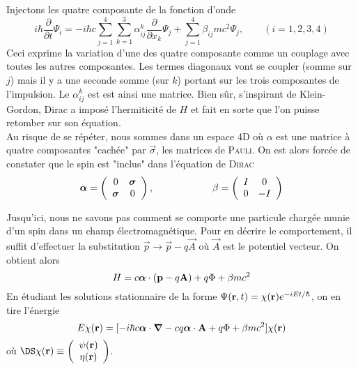 Injectons les quatre composante de la fonction d'onde
\begin{equation}
i \hbar \frac{\partial}{\partial t} \Psi_i = -i \hbar c 
\sum_{j=1}^4 \sum_{k=1}^3 \alpha_{ij}^k 
\frac{\partial}{\partial x_k} \Psi_j 
+ \sum_{j=1}^4 \beta_{ij} mc^2 \Psi_j,\qquad (i=1,2,3,4)
\end{equation}
Ceci exprime la variation d'une des quatre composante comme un couplage avec toutes les autres 
composantes. Les termes diagonaux vont se coupler (somme sur $j$) mais il y a une seconde somme
(sur $k$) portant sur les trois composantes de l'impulsion. Le $\alpha^k_{ij}$ est est ainsi une 
matrice. Bien sûr, s'inspirant de Klein-Gordon, Dirac a imposé l'hermiticité de $H$ et fait en sorte
que l'on puisse retomber sur son équation.\\

Au risque de se répéter, nous sommes dans un espace 4D où $\alpha$ est une matrice à quatre 
composantes "cachée" par $\vec \sigma$, les matrices de \textsc{Pauli}. On est alors forcée de 
constater que le spin est "inclus" dans l'équation de \textsc{Dirac}
\begin{equation}
\mbox{\boldmath $ \alpha $} = 
\left( \begin{array}{cc} 0 & \mbox{\boldmath $ \sigma $} \\
\mbox{\boldmath $ \sigma $} & 0 \end{array} \right),\qquad\qquad\qquad
\beta = 
\left( 
\begin{array}{cc} I & 0 \\
0 & - I    \end{array} \right)
\end{equation}

Jusqu'ici, nous ne savons pas comment se comporte une particule chargée munie d'un spin dans un 
champ électromagnétique. Pour en décrire le comportement, il suffit d'effectuer la substitution
$\vec p \to \vec{p}-q\vec{A}$ où $\vec A$ est le potentiel vecteur. On obtient alors
\begin{equation}
H = 
c  \mbox{\boldmath $ \alpha $} \cdot  ( {\bf p} - q {\bf A} )
+ q \Phi + \beta m c^2
\end{equation}
En étudiant les solutions stationnaire de la forme $\Psi ({\bf r},t) = \chi({\bf r}) e^{-iEt/ \hbar}$,
on en tire l'énergie
\begin{equation}
E \chi({\bf r}) =
[ - i \hbar  c \mbox{\boldmath $ \alpha $} \cdot \mbox{\boldmath $ \nabla $}
- c q \mbox{\boldmath $ \alpha $} \cdot {\bf A} + q \Phi + \beta mc^2 ] \chi({\bf r})
\end{equation}
où $\DS \chi ({\bf r}) \equiv \left( \begin{array}{c}
 \psi({\bf r}) \\ \eta({\bf r}) \end{array} \right)$.\\


